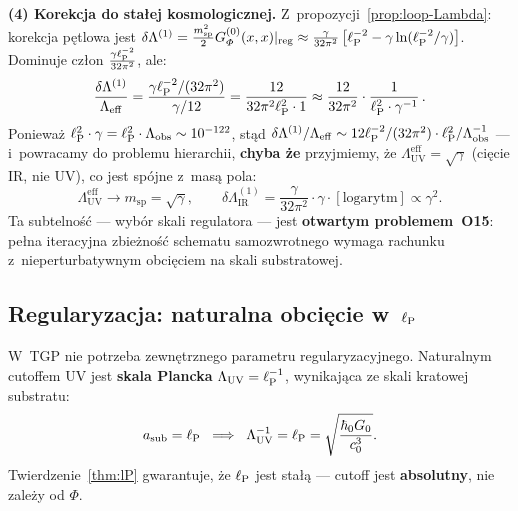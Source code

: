 \begin{proposition}
\noindent\textbf{(4) Korekcja do stałej kosmologicznej.}
Z~propozycji~\ref{prop:loop-Lambda}: korekcja pętlowa jest
$\delta\Lambda^{(1)} = \frac{m_{\mathrm{sp}}^2}{2}
G_\varPhi^{(0)}(x,x)|_{\mathrm{reg}} \approx
\frac{\gamma}{32\pi^2}\left[\ell_{\mathrm{P}}^{-2} - \gamma\ln({\ell_{\mathrm{P}}^{-2}/\gamma})\right]$.
Dominuje człon $\frac{\gamma\ell_{\mathrm{P}}^{-2}}{32\pi^2}$, ale:
\begin{equation}\label{eq:dLambda-ratio}
    \frac{\delta\Lambda^{(1)}}{\Lambda_{\mathrm{eff}}}
    = \frac{\gamma\ell_{\mathrm{P}}^{-2}/(32\pi^2)}{\gamma/12}
    = \frac{12}{32\pi^2\ell_{\mathrm{P}}^2\cdot 1}
    \approx \frac{12}{32\pi^2} \cdot \frac{1}{\ell_{\mathrm{P}}^2\cdot\gamma^{-1}}\,.
\end{equation}
Ponieważ $\ell_{\mathrm{P}}^2 \cdot \gamma = \ell_{\mathrm{P}}^2 \cdot \Lambda_{\mathrm{obs}} \sim 10^{-122}$,
stąd $\delta\Lambda^{(1)}/\Lambda_{\mathrm{eff}} \sim 12\ell_{\mathrm{P}}^{-2}/(32\pi^2) \cdot \ell_{\mathrm{P}}^2/\Lambda_{\mathrm{obs}}^{-1}$
--- i~powracamy do problemu hierarchii, \textbf{chyba że} przyjmiemy,
że $\Lambda_{\mathrm{UV}}^{\mathrm{eff}} = \sqrt{\gamma}$ (cięcie IR,
nie UV), co jest spójne z~masą pola:
\begin{equation}\label{eq:IR-cutoff-argue}
    \Lambda_{\mathrm{UV}}^{\mathrm{eff}} \to m_{\mathrm{sp}} = \sqrt{\gamma},
    \qquad
    \delta\Lambda^{(1)}_{\mathrm{IR}}
    = \frac{\gamma}{32\pi^2}\cdot\gamma\cdot
    [\text{logarytm}] \propto \gamma^2.
\end{equation}
Ta subtelność --- wybór skali regulatora --- jest
\textbf{otwartym problemem~O15}: pełna iteracyjna zbieżność
schematu samozwrotnego wymaga rachunku z~nieperturbatywnym
obcięciem na skali substratowej.
\end{proposition}

\subsection{Regularyzacja: naturalna obcięcie w~$\ell_{\mathrm{P}}$}%
\label{app:E-cutoff}

\begin{theorem}\label{thm:natural-cutoff}
W~TGP nie potrzeba zewnętrznego parametru regularyzacyjnego.
Naturalnym cutoffem UV jest \textbf{skala Plancka}
$\Lambda_{\mathrm{UV}} = \ell_{\mathrm{P}}^{-1}$, wynikająca ze skali kratowej
substratu:
\begin{equation}\label{eq:UV-cutoff}
    a_{\mathrm{sub}} = \ell_{\mathrm{P}}
    \;\;\Longrightarrow\;\;
    \Lambda_{\mathrm{UV}}^{-1} = \ell_{\mathrm{P}} = \sqrt{\frac{\hbar_0 G_0}{c_0^3}}.
\end{equation}
Twierdzenie~\ref{thm:lP} gwarantuje, że $\ell_{\mathrm{P}}$ jest stałą ---
cutoff jest \textbf{absolutny}, nie zależy od $\Phi$.
\end{theorem}

